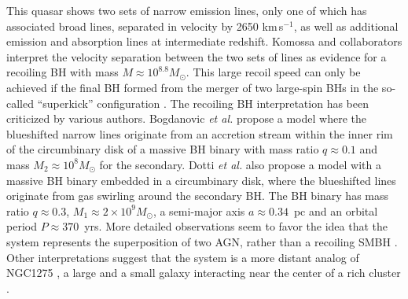 \documentclass[]{iopart}
\begin{document}
%
This quasar shows two sets of narrow emission lines, only one of which has
associated broad lines, separated in velocity by 2650 km\,s$^{-1}$, as well as
additional emission and absorption lines at intermediate redshift. Komossa and
collaborators \cite{Komossa:2008qd} interpret the velocity separation between
the two sets of lines as evidence for a recoiling BH with mass $M\approx
10^{8.8}M_\odot$. This large recoil speed can only be achieved if the final BH
formed from the merger of two large-spin BHs in the so-called ``superkick''
configuration \cite{Gonzalez:2006md,Campanelli:2007ew,Campanelli:2007cga}. The
recoiling BH interpretation has been criticized by various authors. Bogdanovic
{\it et al.}  \cite{Bogdanovic:2008uz} propose a model where the blueshifted
narrow lines originate from an accretion stream within the inner rim of the
circumbinary disk of a massive BH binary with mass ratio $q\approx 0.1$ and
mass $M_2\approx 10^8M_\odot$ for the secondary.  Dotti {\it et al.}
\cite{Dotti:2008yb} also propose a model with a massive BH binary embedded in
a circumbinary disk, where the blueshifted lines originate from gas swirling
around the secondary BH. The BH binary has mass ratio $q\approx 0.3$,
$M_1\approx 2\times 10^9M_\odot$, a semi-major axis $a\approx 0.34$~pc and an
orbital period $P\approx 370$~yrs.  More detailed observations seem to favor
the idea that the system represents the superposition of two AGN, rather than
a recoiling SMBH \cite{Shields:2008kn}.  Other interpretations suggest that
the system is a more distant analog of NGC1275 \cite{Heckman:2008en}, a large
and a small galaxy interacting near the center of a rich cluster
\cite{Conselice:2001gp}.
\end{document}

